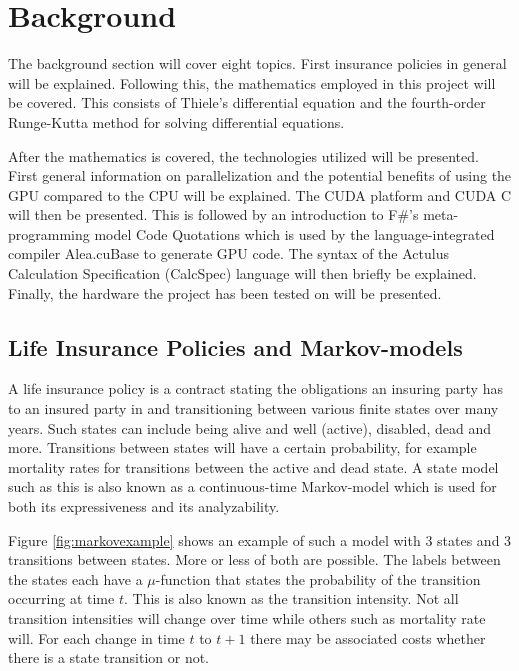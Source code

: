 \section{Background}
The background section will cover eight topics.
First insurance policies in general will be explained.
Following this, the mathematics employed in this project will be covered. 
This consists of Thiele's differential equation and the fourth-order Runge-Kutta method for solving differential equations.

After the mathematics is covered, the technologies utilized will be presented.
First general information on parallelization and the potential benefits of using the GPU compared to the CPU will be explained.
The CUDA platform and CUDA C will then be presented.
This is followed by an introduction to F\#'s meta-programming model Code Quotations which is used by the language-integrated compiler Alea.cuBase to generate GPU code.
The syntax of the Actulus Calculation Specification (CalcSpec) language will then briefly be explained.
Finally, the hardware the project has been tested on will be presented.

\subsection{Life Insurance Policies and Markov-models}
A life insurance policy is a contract stating the obligations an insuring party has to an insured party in and transitioning between various finite states over many years.
Such states can include being alive and well (active), disabled, dead and more.
Transitions between states will have a certain probability, for example mortality rates for transitions between the active and dead state.
A state model such as this is also known as a continuous-time Markov-model which is used for both its expressiveness and its analyzability.

Figure \ref{fig:markovexample} shows an example of such a model with 3 states and 3 transitions between states. More or less of both are possible.
The labels between the states each have a $\mu$-function that states the probability of the transition occurring at time $t$. 
This is also known as the transition intensity.
Not all transition intensities will change over time while others such as mortality rate will.
For each change in time $t$ to $t+1$ there may be associated costs whether there is a state transition or not.

